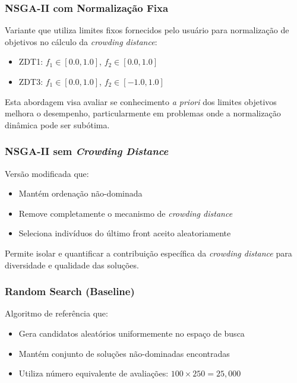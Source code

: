 \subsubsection{NSGA-II com Normalização Fixa}

Variante que utiliza limites fixos fornecidos pelo usuário para normalização de objetivos no cálculo da \textit{crowding distance}:

\begin{itemize}
    \item ZDT1: $f_1 \in [0.0, 1.0]$, $f_2 \in [0.0, 1.0]$
    \item ZDT3: $f_1 \in [0.0, 1.0]$, $f_2 \in [-1.0, 1.0]$
\end{itemize}

Esta abordagem visa avaliar se conhecimento \textit{a priori} dos limites objetivos melhora o desempenho, particularmente em problemas onde a normalização dinâmica pode ser subótima.

\subsubsection{NSGA-II sem \textit{Crowding Distance}}

Versão modificada que:
\begin{itemize}
    \item Mantém ordenação não-dominada
    \item Remove completamente o mecanismo de \textit{crowding distance}
    \item Seleciona indivíduos do último front aceito aleatoriamente
\end{itemize}

Permite isolar e quantificar a contribuição específica da \textit{crowding distance} para diversidade e qualidade das soluções.

\subsubsection{Random Search (Baseline)}

Algoritmo de referência que:
\begin{itemize}
    \item Gera candidatos aleatórios uniformemente no espaço de busca
    \item Mantém conjunto de soluções não-dominadas encontradas
    \item Utiliza número equivalente de avaliações: $100 \times 250 = 25{,}000$
\end{itemize}

